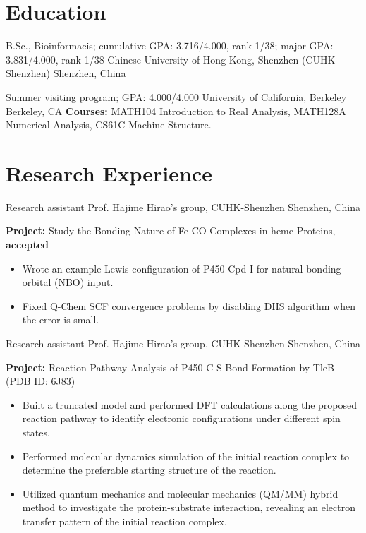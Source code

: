 \documentclass[11pt]{moderncv}
\begin{document}
\maketitle



\vspace{-3em}
\section{Education}
{B.Sc., Bioinformacis; cumulative GPA: 3.716/4.000, rank 1/38; major GPA: 3.831/4.000, rank 1/38}
{Chinese University of Hong Kong, Shenzhen (CUHK-Shenzhen)}
{Shenzhen, China}
{}
{}

{Summer visiting program; GPA: 4.000/4.000}
{University of California, Berkeley}
{Berkeley, CA}
{}
{\textbf{Courses:} MATH104 Introduction to Real Analysis, MATH128A Numerical Analysis, CS61C Machine Structure.}


\vspace{-0.75em}
\section{Research Experience}
{Research assistant}
{Prof. Hajime Hirao's group, CUHK-Shenzhen}
{Shenzhen, China}
{}
{\textbf{Project:} Study the Bonding Nature of Fe-CO Complexes in heme Proteins, \textbf{accepted}
    \begin{itemize}\setlength\itemsep{-1pt}
        \item Wrote an example Lewis configuration of P450 Cpd I for natural bonding orbital (NBO) input.
        \item Fixed Q-Chem SCF convergence problems by disabling DIIS algorithm when the error is small.
    \end{itemize}
}

{Research assistant}
{Prof. Hajime Hirao's group, CUHK-Shenzhen}
{Shenzhen, China}
{}
{\textbf {Project:} Reaction Pathway Analysis of P450 C-S Bond Formation by TleB (PDB ID: 6J83)
    \begin{itemize}\setlength\itemsep{-1pt}
    \item Built a truncated model and performed DFT calculations along the proposed reaction pathway to identify electronic configurations under different spin states.
    \item Performed molecular dynamics simulation of the initial reaction complex to determine the preferable starting structure of the reaction.
    \item Utilized quantum mechanics and molecular mechanics (QM/MM) hybrid method to investigate the protein-substrate interaction, revealing an electron transfer pattern of the initial reaction complex.
\end{itemize}
}
\end{document}
